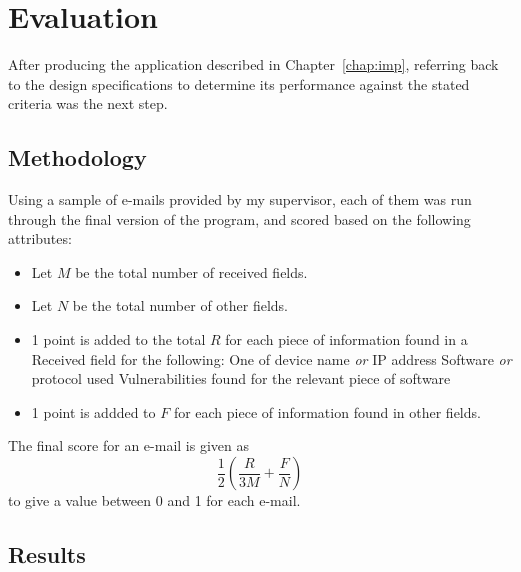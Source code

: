 \chapter{Evaluation}\label{chap:test}
After producing the application described in Chapter~\ref{chap:imp}, referring back to the design specifications to determine its performance against the stated criteria was the next step.
\section{Methodology}
Using a sample of e-mails provided by my supervisor, each of them was run through the final version of the program, and scored based on the following attributes:

\begin{itemize}
\item Let $M$ be the total number of received fields.
\item Let $N$ be the total number of other fields.
\item 1 point is added to the total $R$ for each piece of information found in a Received field for the following:
\subitem One of device name \emph{or} IP address
\subitem Software \emph{or} protocol used
\subitem Vulnerabilities found for the relevant piece of software
\item 1 point is addded to $F$ for each piece of information found in other fields.
\end{itemize}

The final score for an e-mail is given as \[\frac12\left(\frac R{3M}+\frac FN\right)\]to give a value between 0 and 1 for each e-mail.

\section{Results}
